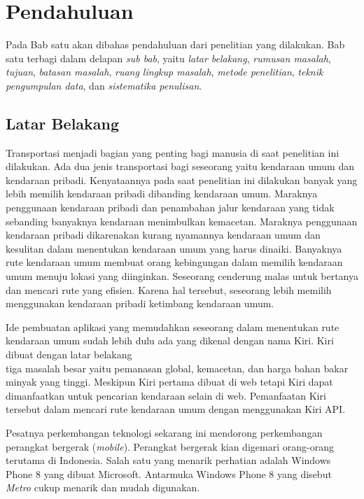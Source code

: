 \chapter{Pendahuluan}
\label{chap:intro}

Pada Bab satu akan dibahas pendahuluan dari penelitian yang dilakukan. Bab satu terbagi dalam delapan \textit{sub bab}, yaitu \textit{latar belakang}, \textit{rumusan masalah}, \textit{tujuan}, \textit{batasan masalah}, \textit{ruang lingkup masalah}, \textit{metode penelitian}, \textit{teknik pengumpulan data}, dan \textit{sistematika penulisan}.

\section{Latar Belakang}
\label{sec:latar_belakang}
\hspace{0.5cm} Transportasi menjadi bagian yang penting bagi manusia di saat penelitian ini dilakukan. Ada dua jenis transportasi bagi seseorang yaitu kendaraan umum dan kendaraan pribadi. Kenyataannya pada saat penelitian ini dilakukan banyak yang lebih memilih kendaraan pribadi dibanding kendaraan umum. Maraknya penggunaan kendaraan pribadi dan penambahan jalur kendaraan yang tidak sebanding banyaknya kendaraan menimbulkan kemacetan. Maraknya penggunaan kendaraan pribadi dikarenakan kurang nyamannya kendaraan umum dan kesulitan dalam menentukan kendaraan umum yang harus dinaiki. Banyaknya rute kendaraan umum membuat orang kebingungan dalam memilih kendaraan umum menuju lokasi yang diinginkan. Seseorang cenderung malas untuk bertanya dan mencari rute yang efisien. Karena hal tersebut, seseorang lebih memilih menggunakan kendaraan pribadi ketimbang kendaraan umum. 

Ide pembuatan aplikasi yang memudahkan seseorang dalam menentukan rute kendaraan umum sudah lebih dulu ada yang dikenal dengan nama Kiri. Kiri dibuat dengan latar belakang \\ tiga masalah besar yaitu pemanasan global, kemacetan, dan harga bahan bakar minyak yang tinggi\footnotemark[1]. Meskipun Kiri pertama dibuat di web tetapi Kiri dapat dimanfaatkan untuk pencarian kendaraan selain di web. Pemanfaatan Kiri tersebut dalam mencari rute kendaraan umum dengan menggunakan Kiri API.

Pesatnya perkembangan teknologi sekarang ini mendorong perkembangan perangkat bergerak (\textit{mobile}). Perangkat bergerak kian digemari orang-orang terutama di Indonesia. Salah satu yang menarik perhatian adalah Windows Phone 8 yang dibuat Microsoft. Antarmuka Windows Phone 8 yang disebut \textit{Metro} cukup menarik dan mudah digunakan. 

